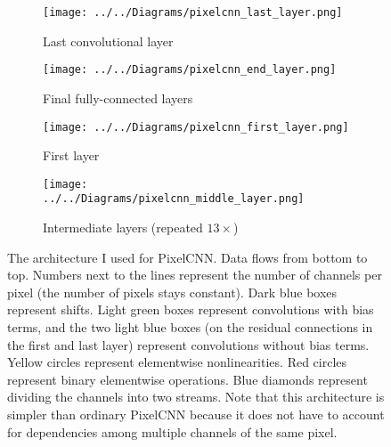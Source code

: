\documentclass[11pt, a4paper, openany]{book}
\begin{document}
\begin{figure}
  \centering
    \begin{subfigure}{0.45\columnwidth}
    	\addtocounter{subfigure}{2}
        \centering
        \caption{Last convolutional layer}
        \texttt{[image: ../../Diagrams/pixelcnn\_last\_layer.png]} 
        \label{pixelcnn:last}
    \end{subfigure}
    \hfill
    \begin{subfigure}{0.45\columnwidth}
        \centering
        \caption{Final fully-connected layers}
        \texttt{[image: ../../Diagrams/pixelcnn\_end\_layer.png]} 
        \label{pixelcnn:end}
    \end{subfigure}
    \vspace{1cm}
    \addtocounter{subfigure}{-4}
    \begin{subfigure}{0.45\columnwidth}
        \centering
        \caption{First layer}
        \texttt{[image: ../../Diagrams/pixelcnn\_first\_layer.png]} 
        \label{pixelcnn:first}
    \end{subfigure}
    \hfill
    \begin{subfigure}{0.45\columnwidth}
        \centering
        \caption{Intermediate layers (repeated $13\times$)}
        \texttt{[image: ../../Diagrams/pixelcnn\_middle\_layer.png]} 
        \label{pixelcnn:middle}
    \end{subfigure}
  \caption[Architecture of PixelCNN]{The architecture I used for PixelCNN. Data flows from bottom to top. Numbers next to the lines represent the number of channels per pixel (the number of pixels stays constant). Dark blue boxes represent shifts. Light green boxes represent convolutions with bias terms, and the two light blue boxes (on the residual connections in the first and last layer) represent convolutions without bias terms. Yellow circles represent elementwise nonlinearities. Red circles represent binary elementwise operations. Blue diamonds represent dividing the channels into two streams. Note that this architecture is simpler than ordinary PixelCNN because it does not have to account for dependencies among multiple channels of the same pixel.}
  \label{pixelcnn}
\end{figure}
\end{document}
